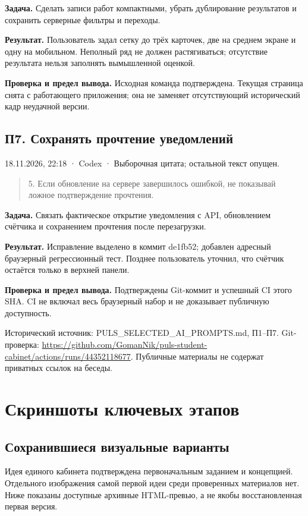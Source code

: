 \documentclass[11pt,a4paper]{article}
\newcommand{\source}[1]{{\small\color{muted}#1\par}}
\begin{document}
\textbf{Задача.} Сделать записи работ компактными, убрать дублирование результатов и сохранить серверные фильтры и переходы.


\textbf{Результат.} Пользователь задал сетку до трёх карточек, две на среднем экране и одну на мобильном. Неполный ряд не должен растягиваться; отсутствие результата нельзя заполнять вымышленной оценкой.


\textbf{Проверка и предел вывода.} Исходная команда подтверждена. Текущая страница снята с работающего приложения; она не заменяет отсутствующий исторический кадр неудачной версии.


\clearpage

\subsection{П7. Сохранять прочтение уведомлений}

\source{18.11.2026, 22:18 · Codex · Выборочная цитата; остальной текст опущен.}

\begin{quote}\small 5. Если обновление на сервере завершилось ошибкой, не показывай ложное подтверждение прочтения.\end{quote}

\textbf{Задача.} Связать фактическое открытие уведомления с API, обновлением счётчика и сохранением прочтения после перезагрузки.


\textbf{Результат.} Исправление выделено в коммит de1fb52; добавлен адресный браузерный регрессионный тест. Позднее пользователь уточнил, что счётчик остаётся только в верхней панели.


\textbf{Проверка и предел вывода.} Подтверждены Git-коммит и успешный CI этого SHA. CI не включал весь браузерный набор и не доказывает публичную доступность.


\source{Исторический источник: PULS\_SELECTED\_AI\_PROMPTS.md, П1–П7. Git-проверка: \url{https://github.com/GomanNik/puls-student-cabinet/actions/runs/44352118677}. Публичные материалы не содержат приватных ссылок на беседы.}
\clearpage
\section{Скриншоты ключевых этапов}
\subsection{Сохранившиеся визуальные варианты}
Идея единого кабинета подтверждена первоначальным заданием и концепцией. Отдельного изображения самой первой идеи среди проверенных материалов нет. Ниже показаны доступные архивные HTML-превью, а не якобы восстановленная первая версия.
\end{document}
